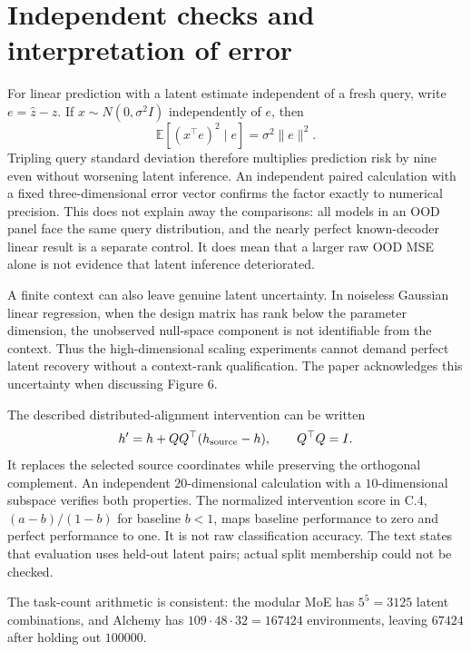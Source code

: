 \documentclass[10pt]{article}
\begin{document}
\section*{Independent checks and interpretation of error}
For linear prediction with a latent estimate independent of a fresh query, write \(e=\widehat z-z\). If \(x\sim N(0,\sigma^2I)\) independently of \(e\), then \[\mathbb E[(x^\top e)^2\mid e]=\sigma^2\|e\|^2.\] Tripling query standard deviation therefore multiplies prediction risk by nine even without worsening latent inference. An independent paired calculation with a fixed three-dimensional error vector confirms the factor exactly to numerical precision. This does not explain away the comparisons: all models in an OOD panel face the same query distribution, and the nearly perfect known-decoder linear result is a separate control. It does mean that a larger raw OOD MSE alone is not evidence that latent inference deteriorated.\par
A finite context can also leave genuine latent uncertainty. In noiseless Gaussian linear regression, when the design matrix has rank below the parameter dimension, the unobserved null-space component is not identifiable from the context. Thus the high-dimensional scaling experiments cannot demand perfect latent recovery without a context-rank qualification. The paper acknowledges this uncertainty when discussing Figure 6.\par
The described distributed-alignment intervention can be written \[h'=h+QQ^\top(h_{\rm source}-h),\qquad Q^\top Q=I.\] It replaces the selected source coordinates while preserving the orthogonal complement. An independent \(20\)-dimensional calculation with a \(10\)-dimensional subspace verifies both properties. The normalized intervention score in C.4, \((a-b)/(1-b)\) for baseline \(b<1\), maps baseline performance to zero and perfect performance to one. It is not raw classification accuracy. The text states that evaluation uses held-out latent pairs; actual split membership could not be checked.\par
The task-count arithmetic is consistent: the modular MoE has \(5^5=3125\) latent combinations, and Alchemy has \(109\cdot48\cdot32=167424\) environments, leaving \(67424\) after holding out \(100000\).\par
\end{document}

